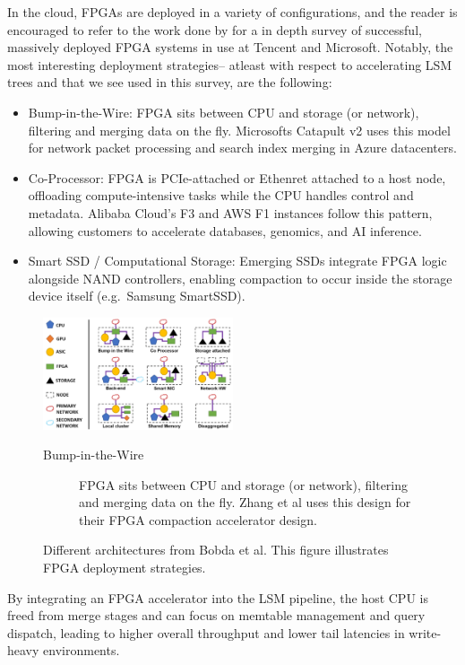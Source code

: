 \documentclass[sigconf]{acmart}
\begin{document}
  In the cloud, FPGAs are deployed in a variety of configurations, and the reader is encouraged to refer to the work done by \cite{bobda2022future} for a in depth survey of successful, massively deployed FPGA systems in use at Tencent and Microsoft.
  Notably, the most interesting deployment strategies-- atleast with respect to accelerating LSM trees and that we see used in this survey, are the following:
   \begin{itemize}
    \item Bump-in-the-Wire: FPGA sits between CPU and storage (or network), filtering and merging data on the fly.  Microsofts Catapult v2 uses this model for network packet processing and search index merging in Azure datacenters. \cite{bobda2022future}
    \item Co-Processor: FPGA is PCIe-attached or Ethenret attached to a host node, offloading compute-intensive tasks while the CPU handles control and metadata.  Alibaba Cloud’s F3 and AWS F1 instances follow this pattern, allowing customers to accelerate databases, genomics, and AI inference. \cite{bobda2022future}
    \item Smart SSD / Computational Storage: Emerging SSDs integrate FPGA logic alongside NAND controllers, enabling compaction to occur inside the storage device itself (e.g.\ Samsung SmartSSD).
  \end{itemize}
\begin{figure}[ht]
  \centering
  \includegraphics[width=0.5\textwidth]{bobka.png}
  \caption{Different architectures from Bobda et al\cite{bobda2022future}. This figure illustrates FPGA deployment strategies.}\label{fig:SSTable} %
  \begin{description}
    \item[Bump-in-the-Wire] FPGA sits between CPU and storage (or network), filtering and merging data on the fly.  Zhang et al uses this design for their FPGA compaction accelerator design.
  \end{description}
\end{figure}


  By integrating an FPGA accelerator into the LSM pipeline, the host CPU is freed from merge stages and can focus on memtable management and query dispatch, leading to higher overall throughput and lower tail latencies in write-heavy environments.
\end{document}
